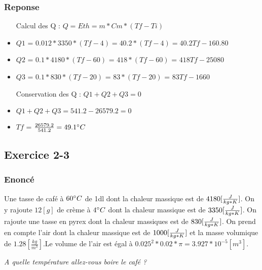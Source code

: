 \subsubsection{Reponse}
\begin{itemize}
    \item[Calcul des Q] : $Q = Eth = m * Cm * (Tf-Ti)$
    \item $Q1$ = $0.012 * 3350 * (Tf - 4) = 40.2 * (Tf-4) = 40.2Tf - 160.80$
    \item $Q2$ = $0.1 * 4180 * (Tf - 60)$ = $418 * (Tf - 60)$ = $418Tf - 25080$
    \item $Q3$ = $0.1 * 830 * (Tf - 20)$ = $83 * (Tf - 20)$ = $83Tf - 1660$
    \item[Conservation des Q] : $Q1 + Q2 +Q3 = 0$
    \item $Q1 + Q2 + Q3 = 541.2 - 26579.2 = 0$
    \item $Tf$ = $\frac{26579.2}{541.2} = 49.1\celsius $
\end{itemize}


\subsection{Exercice 2-3}
\subsubsection{Enoncé}
Une tasse de café à $60\celsius$ de 1dl dont la chaleur massique est de $4180[\cm]$. On y rajoute $12[g]$ de crème à $4\celsius$ dont la chaleur massique est de $3350[\cm]$. On rajoute une tasse en pyrex dont la chaleur massiques est de $830[\cm]$. On prend en compte l'air dont la chaleur massique est de $1000[\cm]$ et la masse volumique de $1.28[\frac{kg}{m^3}]$.Le volume de l'air est égal à $0.025^2 * 0.02 * \pi = 3.927*10^{-5}[m^3]$.

\textit{A quelle température allez-vous boire le café ?}
